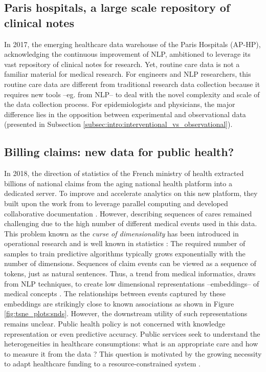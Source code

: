 \documentclass[french,12pt,twoside,a4paper]{book}
\begin{document}
\subsection{Paris hospitals, a large scale repository of clinical notes}

In 2017, the emerging healthcare data warehouse of the Paris Hospitals (AP-HP),
acknowledging the continuous improvement of NLP, ambitioned to leverage its vast
repository of clinical notes for research.
Yet, routine care data is not a familiar material for medical research. For
engineers and NLP researchers, this routine care data are different from
traditional research data collection because it requires new tools --eg. from
NLP-- to deal with the novel complexity and scale of the data collection
process. For epidemiologists and physicians, the major difference lies in the
opposition between experimental and observational data (presented in Subsection
\ref{subsec:intro:interventional_vs_observational}).

\subsection{Billing claims: new data for public health?}
%
In 2018, the direction of statistics of the French ministry of health extracted
billions of national claims from the aging national health platform into a
dedicated server.
%
To improve and accelerate analytics on this new platform, they built upon the
work from \cite{bacry2020scalpel3} to leverage parallel computing and developed
collaborative documentation \citep{documentation_snds}. However, describing
sequences of cares remained challenging due to the high number of different
medical events used in this data. This problem known as the \emph{curse of
  dimensionality} has been introduced in operational research
\citep{bellman1957dynamic} and is well known in statistics
\citep{breiman2001statistical}: The required number of samples to train
predictive algorithms typically grows exponentially with the number of dimensions.
Sequences of claim events can be viewed as a sequence of tokens, just as natural
sentences. Thus, a trend from medical informatics, draws from NLP techniques, to
create low dimensional representations --embeddings-- of medical concepts
\citep{beam2019clinical}. The relationships between events captured by these
embeddings are strikingly close to known associations as shown in Figure
\ref{fig:tsne_plots:snds}. However, the downstream utility of such
representations remains unclear. Public health policy is not concerned with
knowledge representation or even predictive accuracy. Public services seek to
understand the heterogeneities in healthcare consumptions: what is an
appropriate care and how to measure it from the data
\citep{cma_policy_appropriateness_2015}? This question is motivated by the
growing necessity to adapt healthcare funding to a resource-constrained system
\citep{mcginnis2013best,aubert_2019}.
\end{document}
